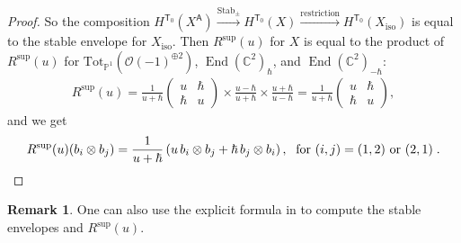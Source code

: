 \documentclass[10pt]{amsart}
\theoremstyle{definition}
\newtheorem{Remark}[Theorem]{Remark}
\numberwithin{equation}{section}
\newcommand{\GL}{\mathrm{GL}}
\newcommand{\bC}{\mathbb{C}}
\newcommand{\bP}{\mathbb{P}}
\newcommand{\bd}{\mathbf{d}}
\newcommand{\cM}{\mathcal{M}}
\newcommand{\sA}{\mathsf{A}}
\newcommand{\sT}{\mathsf{T}}
\newcommand{\End}{\operatorname{End}}
\newcommand{\Stab}{\operatorname{Stab}}
\begin{document}
\begin{proof}
So the composition $H^{\sT_0}(X^\sA)\xrightarrow{\Stab_{\pm}} H^{\sT_0}(X)\xrightarrow{\text{restriction}} H^{\sT_0}(X_{\mathrm{iso}})$ is equal to the stable envelope for $X_{\mathrm{iso}}$. Then $R^{\mathrm{sup}}(u)$ for $X$ is equal to the product of $R^{\mathrm{sup}}(u)$ for $\mathrm{Tot}_{\bP^1}(\mathcal O(-1)^{\oplus 2})$, $\End(\bC^2)_\hbar$, and $\End(\bC^2)_{-\hbar}$:
\begin{align*}
R^{\mathrm{sup}}(u)=\frac{1}{u+\hbar}\begin{pmatrix}
u & \hbar\\
\hbar & u
\end{pmatrix}\times \frac{u-\hbar}{u+\hbar}\times \frac{u+\hbar}{u-\hbar}=\frac{1}{u+\hbar}\begin{pmatrix}
u & \hbar\\
\hbar & u
\end{pmatrix},
\end{align*}
and we get 
\begin{equation*}
R^{\mathrm{sup}}(u)(b_i\otimes b_j)=\frac{1}{u+\hbar}\left(u\,b_i\otimes b_j+\hbar \,b_j\otimes b_i \right),\;\text{ for $(i,j)=(1,2)$ or $(2,1)$}\; . \qedhere
\end{equation*}
\end{proof}

\begin{Remark}
One can also use the explicit formula in \cite[Cor.~4.25]{COZZ} to compute the stable envelopes and $R^{\mathrm{sup}}(u)$.
\end{Remark}

\end{document}
